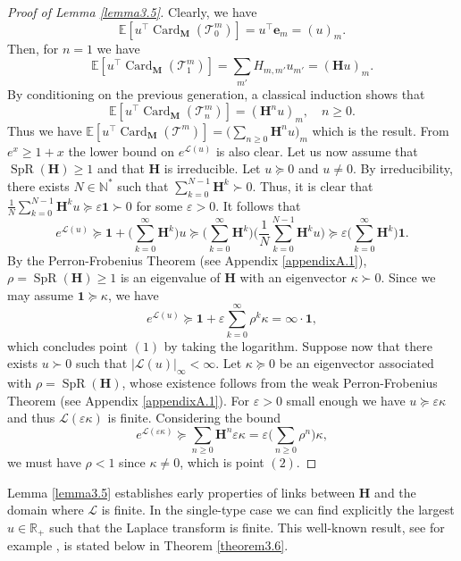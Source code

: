 \documentclass[reqno,final,11pt]{amsart}
\renewcommand{\cite}{\citet}
\theoremstyle{plain}
\theoremstyle{definition}
\theoremstyle{remark}
\newcommand{\R}{\mathds{R}}
\newcommand{\N}{\mathds{N}}
\newcommand{\E}[1]{\mathds{E}\left[#1\right]}
\newcommand{\M}{\bm{M}}
\newcommand{\T}{\mathcal{T}}
\renewcommand{\L}{\bm{\mathscr{L}}}
\newcommand{\ones}{\bm{1}}
\newcommand{\e}{\bm{e}}
\renewcommand{\H}{\bm{H}}
\newcommand{\trp}{^{\intercal}}
\DeclareMathOperator{\card}{Card}
\DeclareMathOperator{\spr}{SpR}
\begin{document}
\begin{proof}[Proof of Lemma \ref{lemma3.5}]
Clearly, we have
\[ \E{u\trp\card_{\M}(\T^m_0)} = u\trp \e_m = (u)_m.\]
Then, for $n=1$ we have
\[ \E{u\trp\card_{\M}(\T^m_1)} = \sum_{m'}H_{m,m'} u_{m'} = (\H u)_m.\]
By conditioning on the previous generation, a classical induction shows that
\[\E{u\trp\card_{\M}(\T^m_n)} =(\H^n u)_m, \quad n\geq 0.\]
Thus we have $\E{u\trp\card_{\M}(\T^m)} = \big(\sum_{n\geq 0} \H^n u\big)_m$ which is the result. From $e^x \geq 1+x$ the lower bound on $e^{\L(u)}$ is also clear. Let us now assume that $\spr(\H)\geq 1$ and that $\H$ is irreducible. Let $u\succeq 0$ and $u\neq 0$. By irreducibility, there exists $N\in\N^*$ such that $\sum_{k=0}^{N-1} \H^k \succ 0$. Thus, it is clear that $\frac{1}{N}\sum_{k=0}^{N-1} \H^ku \succeq \varepsilon\ones \succ 0$ for some $\varepsilon > 0$. It follows that
\begin{equation*}
	e^{\L(u)}  \succeq \ones + \Big(\sum_{k=0}^{\infty} \H^k\Big)u \succeq  \Big(\sum_{k=0}^{\infty} \H^k\Big) \Big(\frac{1}{N}\sum_{k=0}^{N-1} \H^ku\Big) \succeq \varepsilon \Big(\sum_{k=0}^{\infty} \H^k\Big) \ones.
\end{equation*}
By the Perron-Frobenius Theorem (see Appendix \ref{appendixA.1}), $\rho = \spr(\H)\geq 1$ is an eigenvalue of $\H$ with an eigenvector $\kappa \succ 0$. Since we may assume $\ones \succeq \kappa$, we have
\begin{equation*}
	e^{\L(u)}  \succeq \ones + \varepsilon \sum_{k=0}^{\infty} \rho^k \kappa  = \infty\cdot \ones,
\end{equation*} 
which concludes point $(1)$ by taking the logarithm. Suppose now that there exists $u\succ 0$ such that $\vert \L(u)\vert_{\infty}<\infty$. Let $\kappa\succeq0$ be an eigenvector associated with $\rho=\spr(\H)$, whose existence follows from the weak Perron-Frobenius Theorem (see Appendix \ref{appendixA.1}). For $\varepsilon>0$ small enough we have $u\succeq \varepsilon \kappa$ and thus $\L(\varepsilon \kappa)$ is finite. Considering the bound
\[e^{\L(\varepsilon \kappa)} \succeq \sum_{n\geq 0} \H^n \varepsilon\kappa = \varepsilon \Big(\sum_{n\geq 0} \rho^n\Big) \kappa,\]
we must have $\rho<1$ since $\kappa \neq 0$, which is point $(2)$.
\end{proof}

Lemma \ref{lemma3.5} establishes early properties of links between $\H$ and the domain where $\L$ is finite. In the single-type case we can find explicitly the largest $u\in\R_+$ such that the Laplace transform is finite. This well-known result, see for example \cite{bordenave_large_2007,bondesson_class_2004}, is stated below in Theorem \ref{theorem3.6}.
\end{document}
